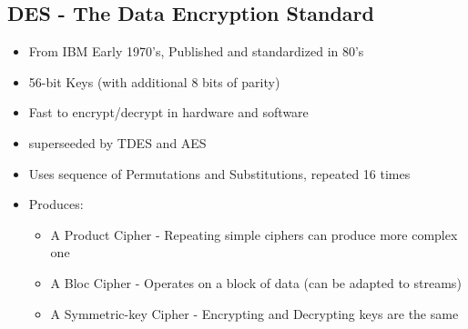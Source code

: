 \documentclass[10pt]{article}
\begin{document}
    \subsection*{DES - The Data Encryption Standard}
      \begin{itemize}
        \item From IBM Early 1970's, Published and standardized in 80's
        \item 56-bit Keys (with additional 8 bits of parity)
        \item Fast to encrypt/decrypt in hardware and software
        \item superseeded by TDES and AES
        \item Uses sequence of Permutations and Substitutions, repeated 16 times
        \item Produces:
          \begin{itemize}
            \item A Product Cipher - Repeating simple ciphers can produce more complex one
            \item A Bloc Cipher - Operates on a block of data (can be adapted to streams)
            \item A Symmetric-key Cipher - Encrypting and Decrypting keys are the same
          \end{itemize}
      \end{itemize}

    \subsection*{}
\end{document}
